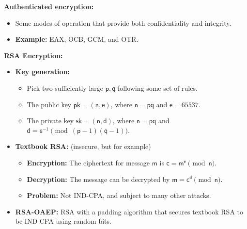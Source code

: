 \documentclass{article}
\newcommand{\msf}[1]{\mathsf{#1}}
\newcommand{\parhead}[1]{\noindent \textbf{#1}}
\begin{document}
\parhead{Authenticated encryption:}
\begin{itemize}
    \item Some modes of operation that provide both confidentiality and integrity.
    \item {\bf Example:} EAX, OCB, GCM, and OTR.
\end{itemize}

\parhead{RSA Encryption:}
\begin{itemize}
    \item {\bf Key generation:}
    \begin{itemize}
        \item Pick two sufficiently large $\msf{p},\msf{q}$ following some set of rules.
        
        \item The public key $\msf{pk}=(\msf{n},\msf{e})$, where $\msf{n}=\msf{p}\msf{q}$ and $\msf{e}=65537$.
        
        \item The private key $\msf{sk}=(\msf{n},\msf{d})$, where $\msf{n}=\msf{p}\msf{q}$ and $\msf{d}=\msf{e}^{-1}\pmod{(\msf{p}-1)(\msf{q}-1)}$. 
    \end{itemize}
    
    \item {\bf Textbook RSA:} (insecure, but for example)
    \begin{itemize}
         \item {\bf Encryption:} The ciphertext for message $\mathsf{m}$ is $\msf{c}=\msf{m}^\msf{e}\pmod{\msf{n}}$. 
         
         \item {\bf Decryption:} The message can be decrypted by $\msf{m}=\msf{c}^\msf{d}\pmod{\msf{n}}$.
         
         \item {\bf Problem:} Not IND-CPA, and subject to many other attacks. 
    \end{itemize}
    
    \item {\bf RSA-OAEP:} RSA with a padding algorithm that secures textbook RSA to be IND-CPA using random bits.
\end{itemize}
\end{document}
